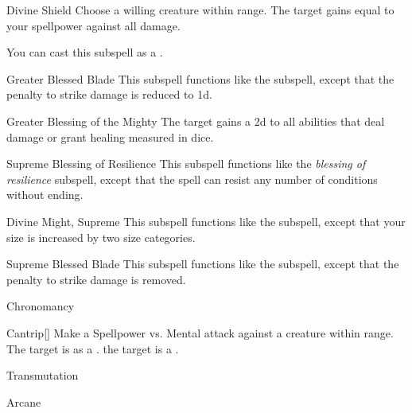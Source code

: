 \begin{ability}[\nth{6}]{Divine Shield}
Choose a willing creature within \rngclose range.
The target gains  equal to your spellpower against all damage.

You can cast this subspell as a .
\end{ability}
\vspace{0.25em}


\begin{ability}[\nth{6}]{Greater Blessed Blade}
This subspell functions like the  subspell, except that the penalty to strike damage is reduced to \minus1d.
\end{ability}
\vspace{0.25em}


\begin{ability}[\nth{7}]{Greater Blessing of the Mighty}
The target gains a \plus2d  to all abilities that deal damage or grant healing measured in dice.
\end{ability}
\vspace{0.25em}


\begin{ability}[\nth{7}]{Supreme Blessing of Resilience}
This subspell functions like the \textit{blessing of resilience} subspell, except that the spell can resist any number of conditions without ending.
\end{ability}
\vspace{0.25em}


\begin{ability}[\nth{9}]{Divine Might, Supreme}
This subspell functions like the  subspell, except that your size is increased by two size categories.
\end{ability}
\vspace{0.25em}


\begin{ability}[\nth{9}]{Supreme Blessed Blade}
This subspell functions like the  subspell, except that the penalty to strike damage is removed.
\end{ability}
\vspace{0.25em}

\newpage
\begin{spellsection}{Chronomancy}

\begin{spellheader}
\end{spellheader}


\begin{ability}{Cantrip}[]
Make a Spellpower vs. Mental attack against a creature within \rngmed range.
\hit The target is  as a .
\crit the target is  a .
\end{ability}




 Transmutation

 Arcane
\end{spellsection}


